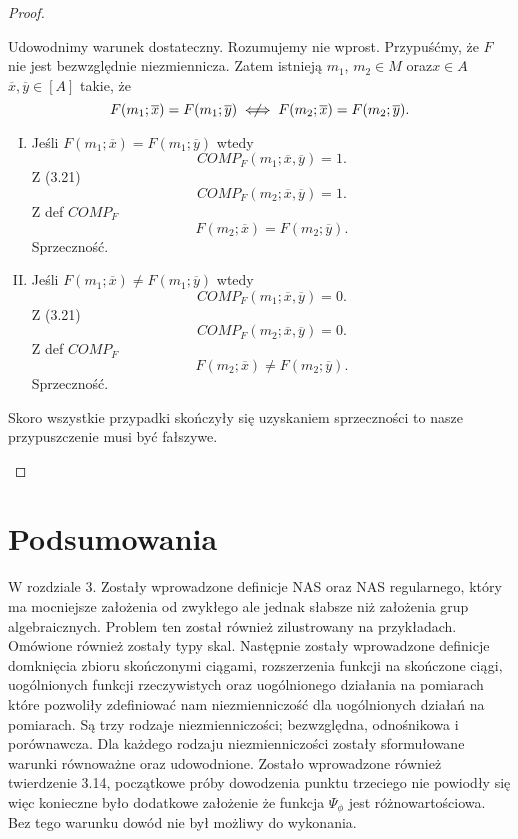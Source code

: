 \documentclass[12pt,a4paper]{report}
\newcommand{\domkniecie}[1]{\left[ {#1} \right] }
\newcommand{\notiff}{%
  \mathrel{{\ooalign{\hidewidth$\not\phantom{"}$\hidewidth\cr$\iff$}}}}
\begin{document}
\begin{proof}
\begin{enumerate}
Udowodnimy warunek dostateczny. Rozumujemy nie wprost. Przypuśćmy, że $F$ nie jest bezwzględnie niezmiennicza. Zatem istnieją $m_1$, $m_2 \in M$ oraz$x\in A$ $\overline{x}, \overline{y} \in \domkniecie{A}$ takie, że
$$
F(m_{1};\overline{x})=F(m_{1};\overline{y}) \notiff F(m_{2};\overline{x})=F(m_{2};\overline{y}).
$$
\begin{enumerate}[I.]
\item
Jeśli $F(m_1;\overline{x})=F(m_1;\overline{y})$ wtedy
$$
COMP_{F}(m_1;\overline{x},\overline{y})=1.
$$
Z (3.21)
$$
COMP_{F}(m_2;\overline{x},\overline{y})=1.
$$
Z def $COMP_F$
$$
F(m_2;\overline{x})=F(m_2;\overline{y}).
$$ 
Sprzeczność.
\item
Jeśli $F(m_1;\overline{x})\ne F(m_1;\overline{y})$ wtedy 
$$
COMP_{F}(m_1;\overline{x},\overline{y})=0.
$$
Z (3.21) 
$$
COMP_{F}(m_2;\overline{x},\overline{y})=0.
$$
Z def $COMP_F$
$$
F(m_2;\overline{x})\ne F(m_2;\overline{y}).
$$ 
Sprzeczność.
\end{enumerate}
Skoro wszystkie przypadki skończyły się uzyskaniem sprzeczności to nasze przypuszczenie musi być fałszywe.
\end{enumerate}
\end{proof}

\chapter{Podsumowania}
W rozdziale 3. Zostały wprowadzone definicje NAS oraz NAS regularnego, który ma mocniejsze założenia od zwykłego ale jednak słabsze niż założenia grup algebraicznych. Problem ten został również zilustrowany na przykładach. Omówione również zostały typy skal. Następnie zostały wprowadzone definicje domknięcia zbioru skończonymi ciągami, rozszerzenia funkcji na skończone ciągi, uogólnionych funkcji rzeczywistych oraz uogólnionego działania na pomiarach które pozwoliły zdefiniować nam niezmienniczość dla uogólnionych działań na pomiarach. Są trzy rodzaje niezmienniczości; bezwzględna, odnośnikowa i porównawcza. Dla każdego rodzaju niezmienniczości zostały sformułowane warunki równoważne oraz udowodnione.  Zostało wprowadzone również twierdzenie 3.14, początkowe próby dowodzenia punktu trzeciego nie powiodły się więc konieczne było dodatkowe  założenie że funkcja $\Psi_{\phi}$ jest różnowartościowa. Bez tego warunku dowód nie był możliwy do wykonania.


\end{document}
